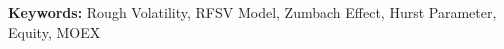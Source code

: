 


    \begin{titlepage}
        \maketitle

        \begin{abstract}
            
        \end{abstract}

        \noindent
        \textbf{Keywords: } Rough Volatility, RFSV Model, Zumbach Effect, Hurst Parameter, Equity, MOEX
        \thispagestyle{empty}
    \end{titlepage}

    \tableofcontents
    \thispagestyle{empty}
    \clearpage

    
    \clearpage

    
    \clearpage

    
    \clearpage

    
    \clearpage

    
    \clearpage

    \printbibliography
    
